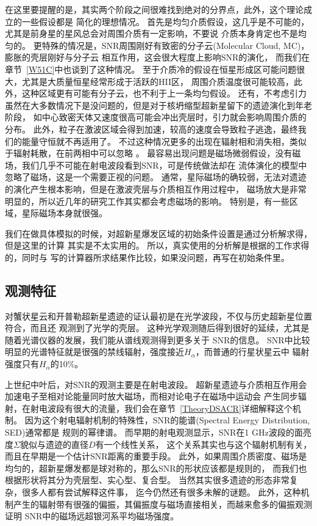 在这里要提醒的是，其实两个阶段之间很难找到绝对的分界点，此外，这个理论成立的一些假设都是
简化的理想情况。
首先是均匀介质假设，这几乎是不可能的，尤其是前身星的星风总会对周围介质有一定影响，不要说
介质本身肯定也不是均匀的。
更特殊的情况是，SNR周围刚好有致密的分子云(Molecular Cloud, MC)，膨胀的壳层刚好与分子云
相互作用，这会很大程度上影响SNR的演化\citep{1972PhDT........47S, Orlando2008, Zhang2017}，
而我们在章节~\ref{W51C}中也谈到了这种情况。
至于介质冷的假设在恒星形成区可能问题很大，尤其是大质量恒星经常形成于活跃的HII区，
周围介质温度很可能较高，此外，这种区域更有可能有分子云，也不利于上一条均匀假设。
还有，不考虑引力虽然在大多数情况下是没问题的，但是对于核坍缩型超新星留下的遗迹演化到年老阶段，
如中心致密天体又速度很高可能会冲出壳层时，引力就会影响周围介质的分布。
此外，粒子在激波区域会得到加速，较高的速度会导致粒子逃逸，最终我们的能量守恒就不再适用了。
不过这种情况更多的出现在辐射相和消失相，类似于辐射耗散，在前两相中可以忽略
\citep{1967IAUS...31..117K}。
最容易出现问题是磁场微弱假设，没有磁场，我们几乎不可能在射电波段看到SNR，可是传统做法却在
流体演化的模型中忽略了磁场，这是一个需要正视的问题。
通常，星际磁场的确较弱，无法对遗迹的演化产生根本影响，但是在激波壳层与介质相互作用过程中，
磁场放大是非常明显的，所以近几年的研究工作其实都会考虑磁场的影响。
特别是，有一些区域，星际磁场本身就很强。

我们在做具体模拟的时候，对超新星爆发区域的初始条件设置是通过分析解求得，但是这里的计算
其实是不太实用的。
所以，真实使用的分析解是根据\citet{Truelove1999}的工作求得的，同时与\citet{Leahy2017a}
写的计算器所求结果作比较，如果没问题，再写在初始条件里。

\subsection{观测特征}
对蟹状星云和开普勒超新星遗迹的证认最初是在光学波段，不仅与历史超新星位置符合，而且还
观测到了光学的壳层。
这种光学观测随后得到很好的延续，尤其是随着光谱仪器的发展，我们能从谱线观测得到更多关于
SNR的信息。
SNR中比较明显的光谱特征就是很强的禁线辐射，强度接近$H_\alpha$，而普通的行星状星云中
辐射强度只有$H_\alpha$的10\%。

上世纪中叶后，对SNR的观测主要是在射电波段。
超新星遗迹与介质相互作用会加速电子至相对论能量同时放大磁场，而相对论电子在磁场中运动会
产生同步辐射，在射电波段有很大的流量，我们会在章节~\ref{TheoryDSACR}详细解释这个机制。
因为这个射电辐射机制的特殊性，SNR的能谱(Spectral Energy Distribution, SED)通常都是
规则的幂律谱。
而早期的射电观测显示，SNR在1 GHz波段的面亮度$\Sigma$貌似与遗迹的直径$D$有一个线性关系，
这个关系其实也与这个辐射机制有关，而且在早期是一个估计SNR距离的重要手段。
此外，如果周围介质密度、磁场是均匀的，超新星爆发都是球对称的，那么SNR的形状应该都是规则的，
而我们也根据形状将其分为壳层型、实心型、复合型。
当然其实很多遗迹的形态非常复杂\citep{West2016}，很多人都有尝试解释这件事\citep{Zhang2018}，
迄今仍然还有很多未解的谜题。
此外，这种机制产生的辐射带有很强的偏振，其偏振度与磁场直接相关，而越来愈多的偏振观测证明
SNR中的磁场远超银河系平均磁场强度。


